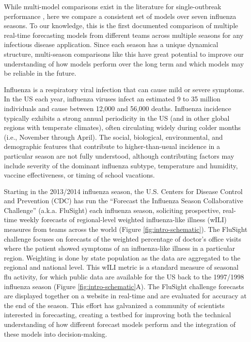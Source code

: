 \documentclass{article}\usepackage[]{graphicx}\usepackage[]{color}
\begin{document}
While multi-model comparisons exist in the literature for single-outbreak performance \cite{Biggerstaff2016,Viboud2017,Biggerstaff2018}, here we compare a consistent set of models over seven influenza seasons. 
To our knowledge, this is the first documented comparison of multiple real-time forecasting models from different teams across multiple seasons for any infectious disease application.
Since each season has a unique dynamical structure, multi-season comparisons like this have great potential to improve our understanding of how models perform over the long term and which models may be reliable in the future.

Influenza is a respiratory viral infection that can cause mild or severe symptoms.
In the US each year, influenza viruses infect an estimated 9 to 35 million individuals and cause between 12,000 and 56,000 deaths.\cite{Rolfes2016}
Influenza incidence typically exhibits a strong annual periodicity in the US (and in other global regions with temperate climates), often circulating widely during colder months (i.e., November through April). 
The social, biological, environmental, and demographic features that contribute to higher-than-usual incidence in a particular season are not fully understood, although contributing factors may include severity of the dominant influenza subtype\cite{thompson2003}, temperature and humidity\cite{lowen2007}, vaccine effectiveness\cite{Rolfes2016}, or timing of school vacations\cite{cauchemez2008}.

Starting in the 2013/2014 influenza season, the U.S. Centers for Disease Control and Prevention (CDC) has run the ``Forecast the Influenza Season Collaborative Challenge'' (a.k.a. FluSight) each influenza season, soliciting prospective, real-time weekly forecasts of regional-level weighted influenza-like illness (wILI) measures from teams across the world (Figure \ref{fig:intro-schematic}).\cite{Biggerstaff2016,Biggerstaff2018}
The FluSight challenge focuses on forecasts of the weighted percentage of doctor's office visits where the patient showed symptoms of an influenza-like illness in a particular region. Weighting is done by state population as the data are aggregated to the regional and national level.
This wILI metric is a standard measure of seasonal flu activity, for which public data are available for the US back to the 1997/1998 influenza season (Figure \ref{fig:intro-schematic}A). 
The FluSight challenge forecasts are displayed together on a website in real-time and are evaluated for accuracy at the end of the season.\cite{PhiResearchLab} 
This effort has galvanized a community of scientists interested in forecasting, creating a testbed for improving both the technical understanding of how different forecast models perform and the integration of these models into decision-making.
\end{document}
